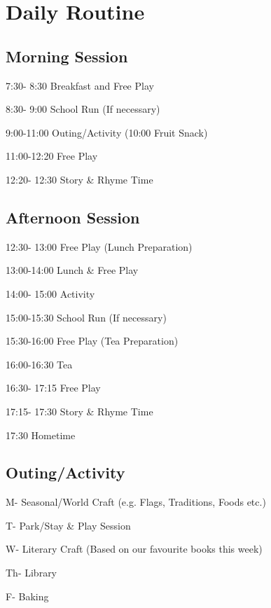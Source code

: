 \documentclass[10pt]{article}
\begin{document}
\section{Daily Routine}

\subsection{Morning Session}

7:30- 8:30 Breakfast and Free Play

8:30- 9:00 School Run (If necessary)

9:00-11:00 Outing/Activity (10:00 Fruit Snack)

11:00-12:20 Free Play

12:20- 12:30 Story \& Rhyme Time

\subsection{Afternoon Session}

12:30- 13:00 Free Play (Lunch Preparation)

13:00-14:00 Lunch \& Free Play

14:00- 15:00 Activity

15:00-15:30 School Run (If necessary)

15:30-16:00 Free Play (Tea Preparation)

16:00-16:30 Tea

16:30- 17:15 Free Play

17:15- 17:30 Story \& Rhyme Time

17:30 Hometime

\subsection{Outing/Activity}

M- Seasonal/World Craft (e.g. Flags, Traditions, Foods etc.)

T- Park/Stay \& Play Session

W- Literary Craft (Based on our favourite books this week)

Th- Library

F- Baking

~
\end{document}
